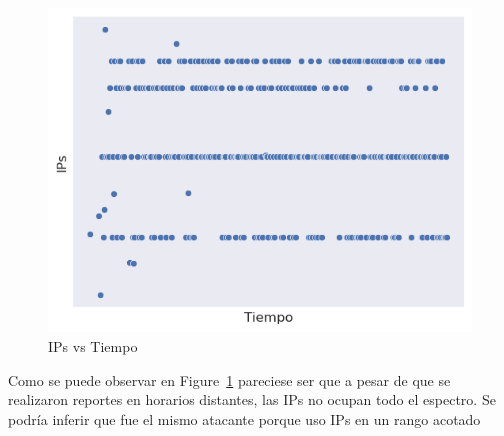 \documentclass[
  letterpaper,
  DIV=11,
  numbers=noendperiod]{scrartcl}
\begin{document}
\begin{figure}[H]

{\centering \includegraphics{Análisis_files/figure-pdf/fig-usodeips-output-1.png}

}

\caption{\label{fig-usodeips}IPs vs Tiempo}

\end{figure}

Como se puede observar en Figure~\ref{fig-usodeips} pareciese ser que a
pesar de que se realizaron reportes en horarios distantes, las IPs no
ocupan todo el espectro. Se podría inferir que fue el mismo atacante
porque uso IPs en un rango acotado
\end{document}
